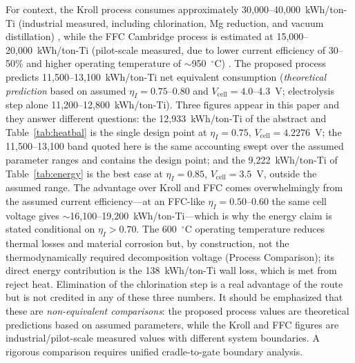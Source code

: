 \documentclass[pdflatex,sn-basic,Numbered]{sn-jnl}
\begin{document}
For context, the Kroll process consumes approximately 30{,}000--40{,}000~kWh/ton-Ti (industrial measured, including chlorination, Mg reduction, and vacuum distillation) \cite{ji2026}, while the FFC Cambridge process is estimated at 15{,}000--20{,}000~kWh/ton-Ti (pilot-scale measured, due to lower current efficiency of 30--50\% and higher operating temperature of $\sim$950~$^{\circ}$C) \cite{ji2026,fray2000}. The proposed process predicts 11{,}500--13{,}100~kWh/ton-Ti net equivalent consumption (\emph{theoretical prediction} based on assumed $\eta_I = 0.75$--0.80 and $V_{\mathrm{cell}} = 4.0$--4.3~V; electrolysis step alone 11{,}200--12{,}800~kWh/ton-Ti). Three figures appear in this paper and they answer different questions: the 12{,}933~kWh/ton-Ti of the abstract and Table~\ref{tab:heatbal} is the single design point at $\eta_I = 0.75$, $V_{\mathrm{cell}} = 4.2276$~V; the 11{,}500--13{,}100 band quoted here is the same accounting swept over the assumed parameter ranges and contains the design point; and the 9{,}222~kWh/ton-Ti of Table~\ref{tab:energy} is the best case at $\eta_I = 0.85$, $V_{\mathrm{cell}} = 3.5$~V, outside the assumed range. The advantage over Kroll and FFC comes overwhelmingly from the assumed current efficiency---at an FFC-like $\eta_I = 0.50$--0.60 the same cell voltage gives $\sim$16{,}100--19{,}200~kWh/ton-Ti---which is why the energy claim is stated conditional on $\eta_I > 0.70$. The 600~$^{\circ}$C operating temperature reduces thermal losses and material corrosion but, by construction, not the thermodynamically required decomposition voltage (Process Comparison); its direct energy contribution is the 138~kWh/ton-Ti wall loss, which is met from reject heat. Elimination of the chlorination step is a real advantage of the route but is not credited in any of these three numbers. It should be emphasized that these are \emph{non-equivalent comparisons}: the proposed process values are theoretical predictions based on assumed parameters, while the Kroll and FFC figures are industrial/pilot-scale measured values with different system boundaries. A rigorous comparison requires unified cradle-to-gate boundary analysis.
\end{document}
